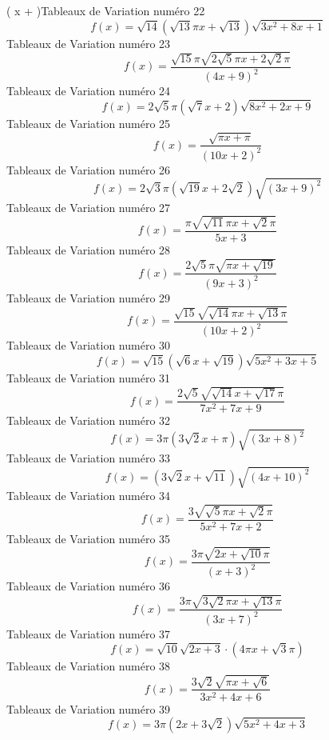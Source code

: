 \documentclass{article}
\begin{document}
\left( x + \pi\right)\]Tableaux de Variation num\'ero 22 \[f(x) = \sqrt{14} \left(\sqrt{13} \pi x + \sqrt{13}\right) \sqrt{3 x^{2} + 8 x + 1}\]Tableaux de Variation num\'ero 23 \[f(x) = \frac{\sqrt{15} \pi \sqrt{2 \sqrt{5} \pi x + 2 \sqrt{2} \pi}}{\left(4 x + 9\right)^{2}}\]Tableaux de Variation num\'ero 24 \[f(x) = 2 \sqrt{5} \pi \left(\sqrt{7} x + 2\right) \sqrt{8 x^{2} + 2 x + 9}\]Tableaux de Variation num\'ero 25 \[f(x) = \frac{\sqrt{\pi x + \pi}}{\left(10 x + 2\right)^{2}}\]Tableaux de Variation num\'ero 26 \[f(x) = 2 \sqrt{3} \pi \left(\sqrt{19} x + 2 \sqrt{2}\right) \sqrt{\left(3 x + 9\right)^{2}}\]Tableaux de Variation num\'ero 27 \[f(x) = \frac{\pi \sqrt{\sqrt{11} \pi x + \sqrt{2} \pi}}{5 x + 3}\]Tableaux de Variation num\'ero 28 \[f(x) = \frac{2 \sqrt{5} \pi \sqrt{\pi x + \sqrt{19}}}{\left(9 x + 3\right)^{2}}\]Tableaux de Variation num\'ero 29 \[f(x) = \frac{\sqrt{15} \sqrt{\sqrt{14} \pi x + \sqrt{13} \pi}}{\left(10 x + 2\right)^{2}}\]Tableaux de Variation num\'ero 30 \[f(x) = \sqrt{15} \left(\sqrt{6} x + \sqrt{19}\right) \sqrt{5 x^{2} + 3 x + 5}\]Tableaux de Variation num\'ero 31 \[f(x) = \frac{2 \sqrt{5} \sqrt{\sqrt{14} x + \sqrt{17} \pi}}{7 x^{2} + 7 x + 9}\]Tableaux de Variation num\'ero 32 \[f(x) = 3 \pi \left(3 \sqrt{2} x + \pi\right) \sqrt{\left(3 x + 8\right)^{2}}\]Tableaux de Variation num\'ero 33 \[f(x) = \left(3 \sqrt{2} x + \sqrt{11}\right) \sqrt{\left(4 x + 10\right)^{2}}\]Tableaux de Variation num\'ero 34 \[f(x) = \frac{3 \sqrt{\sqrt{5} \pi x + \sqrt{2} \pi}}{5 x^{2} + 7 x + 2}\]Tableaux de Variation num\'ero 35 \[f(x) = \frac{3 \pi \sqrt{2 x + \sqrt{10} \pi}}{\left(x + 3\right)^{2}}\]Tableaux de Variation num\'ero 36 \[f(x) = \frac{3 \pi \sqrt{3 \sqrt{2} \pi x + \sqrt{13} \pi}}{\left(3 x + 7\right)^{2}}\]Tableaux de Variation num\'ero 37 \[f(x) = \sqrt{10} \sqrt{2 x + 3} \cdot \left(4 \pi x + \sqrt{3} \pi\right)\]Tableaux de Variation num\'ero 38 \[f(x) = \frac{3 \sqrt{2} \sqrt{\pi x + \sqrt{6}}}{3 x^{2} + 4 x + 6}\]Tableaux de Variation num\'ero 39 \[f(x) = 3 \pi \left(2 x + 3 \sqrt{2}\right) \sqrt{5 x^{2} + 4 x + 3}\]
\end{document}
